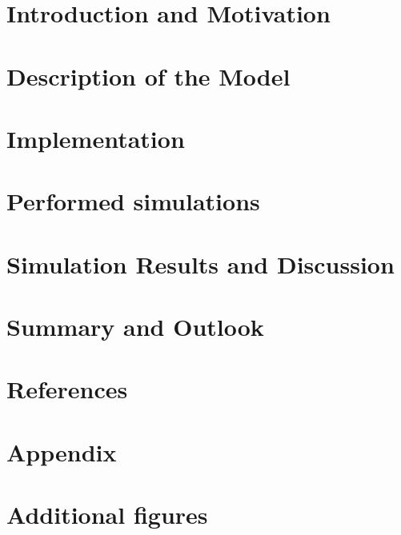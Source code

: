 \documentclass[11pt]{article}
\begin{document}
\section{Introduction and Motivation}

\newpage

\section{Description of the Model}

\newpage

\section{Implementation}

\newpage

\section{Performed simulations}

\newpage

\section{Simulation Results and Discussion}

\newpage

\section{Summary and Outlook}

\newpage

\section{References}


\newpage
\begin{appendix}
\section*{Appendix}

\clearpage
\section{Additional figures}

\clearpage

\end{appendix}



\end{document}
